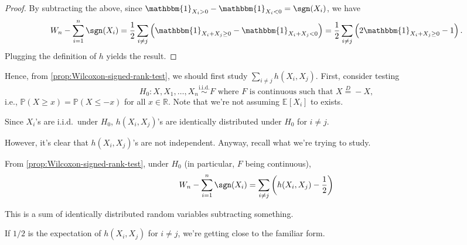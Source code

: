 \begin{proof}
	By subtracting the above, since \(\mathbbm{1}_{X_i > 0} - \mathbbm{1}_{X_i < 0} = \sgn (X_i) \), we have
	\[
		W_n - \sum_{i=1}^{n} \sgn (X_i)
		= \frac{1}{2} \sum_{i \neq j} \left( \mathbbm{1}_{X_i + X_j \geq 0} - \mathbbm{1}_{X_i + X_j < 0} \right)
		= \frac{1}{2} \sum_{i \neq j} \left( 2 \mathbbm{1}_{X_i + X_j \geq 0} - 1 \right).
	\]
	Plugging the definition of \(h\) yields the result.
\end{proof}

Hence, from \autoref{prop:Wilcoxon-signed-rank-test}, we should first study \(\sum_{i \neq j} h(X_i, X_j)\). First, consider testing
\[
	H_0 \colon X, X_1, \dots , X_n \overset{\text{i.i.d.} }{\sim } F \text{ where \(F\) is continuous such that } X \overset{D}{=} -X,
\]
i.e., \(\mathbb{P} (X \geq x) = \mathbb{P} (X \leq -x)\) for all \(x \in \mathbb{R}\). Note that we're not assuming \(\mathbb{E}_{}[X_i] \) to exists.

\begin{note}
	Since \(X_i\)'s are i.i.d.\ under \(H_0\), \(h(X_i, X_j)\)'s are identically distributed under \(H_0\) for \(i \neq j\).
\end{note}

However, it's clear that \(h(X_i, X_j)\)'s are not independent. Anyway, recall what we're trying to study.

\begin{prev}
	From \autoref{prop:Wilcoxon-signed-rank-test}, under \(H_0\) (in particular, \(F\) being continuous),
	\[
		W_n - \sum_{i=1}^{n} \sgn (X_i)
		= \sum_{i \neq j} \left( h(X_i , X_j) - \frac{1}{2} \right)
	\]
\end{prev}
This is a sum of identically distributed random variables subtracting something.

\begin{intuition}
	If \(1 / 2\) is the expectation of \(h(X_i, X_j)\) for \(i \neq j\), we're getting close to the familiar form.
\end{intuition}

